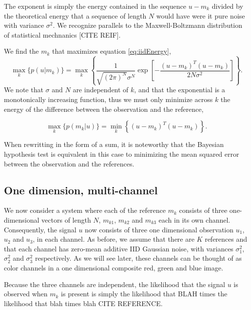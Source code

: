The exponent is simply the energy contained in the sequence $u-m_k$ divided by the
theoretical energy that a sequence of length $N$ would have were it pure noise with variance $\sigma^2$. We recognize parallels to the Maxwell-Boltzmann distribution of statistical
mechnanics [CITE REIF].  

We find the $m_k$ that maximizes equation \ref{eq:iidEnergy},
\begin{equation}
\max_k   \big\{ p(u|m_k) \big\} =  \max_k  \left\{ \frac{1}{  \sqrt{ (2\pi)^N} \sigma^N  } \exp\left[ -\frac{(u-m_k)^T(u-m_k)} {2 N \sigma^2 } \right] \right\}. 
\end{equation}
We note that $\sigma$ and $N$ are independent of $k$, and that the exponential is a monotonically increasing function, thus we must only minimize across $k$ the energy of the difference between the observation and the reference,

\begin{equation}
\max_k   \big\{ p(m_k|u) \big\} =  \min_k  \left\{ (u-m_k)^T(u-m_k) \right\}. 
\end{equation}

When rewritting in the form of a sum,
it is noteworthy that the Bayesian hypothesis test is equivalent in this case to minimizing the mean squared error between the observation and the references.


\subsection{One dimension, multi-channel}
We now consider a system where each of the reference $m_k$ consists of three one-dimensional vectors of length $N$, $m_{k1}$, $m_{k2}$ and $m_{k3}$ each in its own channel. Consequently, the signal $u$ now consists of three one dimensional observation $u_1$, $u_2$ and $u_3$, in each channel. As before, we assume that there are $K$ references and that each channel has zero-mean additive IID Gaussian noise, with variances $\sigma_1^2$,$\sigma_2^2$ and $\sigma_3^2$ respectively. As we will see later, these channels can be thought of as color channels in a one dimensional composite red, green and blue image. 

Because the three channels are independent,  the likelihood that the signal $u$ is observed when $m_k$ is present is simply the likelihood  that BLAH times the likelihood that blah times blah CITE REFERENCE.



